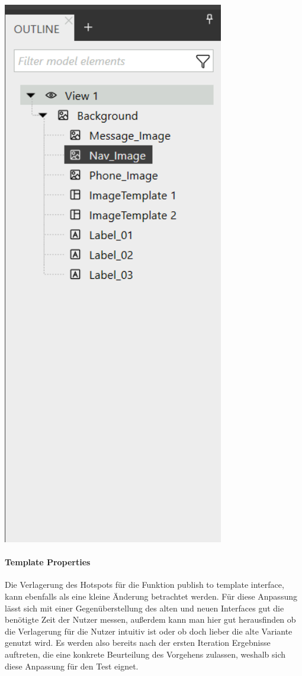 \begin{center}
  \includegraphics[scale=0.8]{figures/Outline.png}
  \label{fig:Outline}
\end{center}

\paragraph{Template Properties}
Die Verlagerung des Hotspots für die Funktion publish to template interface, kann ebenfalls als eine kleine Änderung betrachtet werden.
Für diese Anpassung lässt sich mit einer Gegenüberstellung des alten und neuen Interfaces gut die benötigte Zeit der Nutzer messen, außerdem kann man hier gut herausfinden ob die Verlagerung für die Nutzer intuitiv ist oder ob doch lieber die alte Variante genutzt wird.
Es werden also bereits nach der ersten Iteration Ergebnisse auftreten, die eine konkrete Beurteilung des Vorgehens zulassen, weshalb sich diese Anpassung für den Test eignet.

